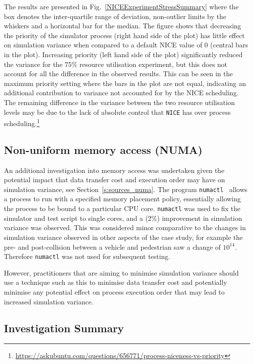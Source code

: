 \documentclass[letterpaper, 10 pt, journal, twoside]{IEEEtran}
\begin{document}
The results are presented in Fig.~\ref{NICEExperimentStressSummary} where the box denotes the inter-quartile range of deviation, non-outlier limits by the whiskers and a horizontal bar for the median. The figure shows that decreasing the priority of the simulator process (right hand side of the  plot) has little effect on simulation variance when compared to a default NICE value of 0 (central bars in the plot). Increasing priority (left hand side of the plot) significantly reduced the variance for the 75\% resource utilisation experiment, but this does not account for all the difference in the observed results. This can be seen in the maximum priority setting where the bars in the plot are not equal, indicating an additional contribution to variance not accounted for by the NICE scheduling. 
%
The remaining difference in the variance between the two resource utilisation levels may be due to the lack of absolute control that \texttt{NICE} has over process scheduling.\footnote{\url{https://askubuntu.com/questions/656771/process-niceness-vs-priority}}

\subsection{Non-uniform memory access (NUMA)} \label{r:numa}
An additional investigation into memory access was undertaken given the potential impact that data transfer cost and execution order may have on simulation variance, see Section~\ref{s:sources_numa}. %
The program \texttt{numactl}~\cite{numactl_NUMA} allows a process to run with a specified memory placement policy, essentially allowing the process to be bound to a particular CPU core. %
\texttt{numactl} was used to fix the simulator and test script to single cores, and a (2\%) improvement in simulation variance was observed. %
This was considered minor comparative to the changes in simulation variance observed in other aspects of the case study, for example the pre- and post-collision between a vehicle and pedestrian saw a change of $10^{14}$. Therefore \texttt{numactl} was not used for subsequent testing.

However, practitioners that are aiming to minimise simulation variance should use a technique such as this to minimise data transfer cost and potentially minimise any potential effect on process execution order that may lead to increased simulation variance. 


\subsection{Investigation Summary} \label{s:empirical_summary} 
\end{document}
